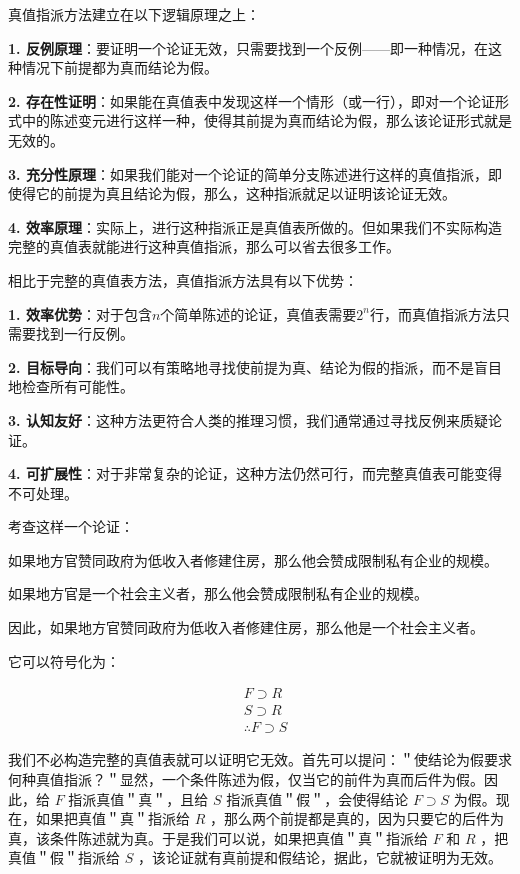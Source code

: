 \begin{theorembox}[title=真值指派方法的逻辑原理]
真值指派方法建立在以下逻辑原理之上：

\textbf{1. 反例原理}：要证明一个论证无效，只需要找到一个反例——即一种情况，在这种情况下前提都为真而结论为假。

\textbf{2. 存在性证明}：如果能在真值表中发现这样一个情形（或一行），即对一个论证形式中的陈述变元进行这样一种，使得其前提为真而结论为假，那么该论证形式就是无效的。

\textbf{3. 充分性原理}：如果我们能对一个论证的简单分支陈述进行这样的真值指派，即使得它的前提为真且结论为假，那么，这种指派就足以证明该论证无效。

\textbf{4. 效率原理}：实际上，进行这种指派正是真值表所做的。但如果我们不实际构造完整的真值表就能进行这种真值指派，那么可以省去很多工作。
\end{theorembox}

\begin{examplebox}[title=真值指派方法的优势]
相比于完整的真值表方法，真值指派方法具有以下优势：

\textbf{1. 效率优势}：对于包含$n$个简单陈述的论证，真值表需要$2^n$行，而真值指派方法只需要找到一行反例。

\textbf{2. 目标导向}：我们可以有策略地寻找使前提为真、结论为假的指派，而不是盲目地检查所有可能性。

\textbf{3. 认知友好}：这种方法更符合人类的推理习惯，我们通常通过寻找反例来质疑论证。

\textbf{4. 可扩展性}：对于非常复杂的论证，这种方法仍然可行，而完整真值表可能变得不可处理。
\end{examplebox}

考查这样一个论证：

如果地方官赞同政府为低收入者修建住房，那么他会赞成限制私有企业的规模。

如果地方官是一个社会主义者，那么他会赞成限制私有企业的规模。

因此，如果地方官赞同政府为低收入者修建住房，那么他是一个社会主义者。

它可以符号化为：

$$
\begin{aligned}
& F \supset R \\
& S \supset R \\
& \therefore F \supset S
\end{aligned}
$$

我们不必构造完整的真值表就可以证明它无效。首先可以提问：＂使结论为假要求何种真值指派？＂显然，一个条件陈述为假，仅当它的前件为真而后件为假。因此，给 $F$ 指派真值＂真＂，且给 $S$ 指派真值＂假＂，会使得结论 $F \supset S$ 为假。现在，如果把真值＂真＂指派给 $R$ ，那么两个前提都是真的，因为只要它的后件为真，该条件陈述就为真。于是我们可以说，如果把真值＂真＂指派给 $F$ 和 $R$ ，把真值＂假＂指派给 $S$ ，该论证就有真前提和假结论，据此，它就被证明为无效。

